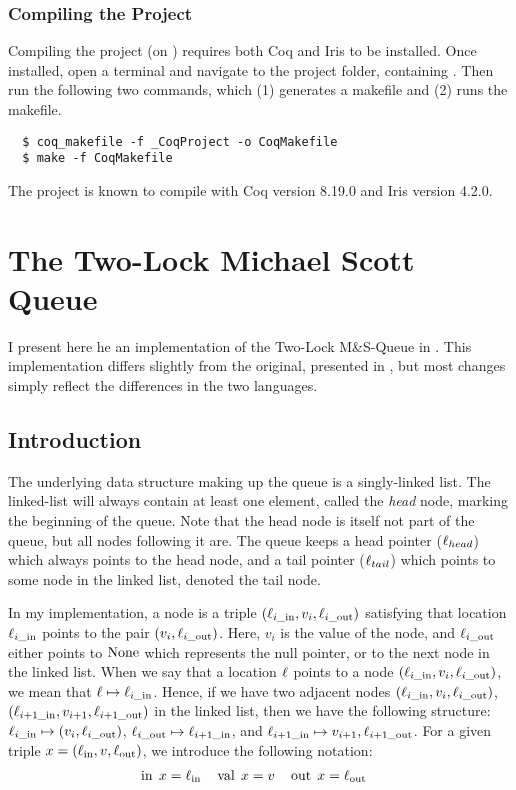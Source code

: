 \documentclass[a4paper, 11pt]{report}
\newcommand{\tlmsq}{Two-Lock M\&S-Queue\xspace}
\newcommand{\locin}[1]{\loc_{#1\_\text{in}}}
\newcommand{\locout}[1]{\loc_{#1\_\text{out}}}
\newcommand{\nIn}[1]{\operatorname{in} \; #1}
\newcommand{\nVal}[1]{\operatorname{val} \; #1}
\newcommand{\nOut}[1]{\operatorname{out} \; #1}
\begin{document}
\subsection{Compiling the Project}
Compiling the project (on \linuxname) requires both Coq and Iris to be installed. Once installed, open a terminal and navigate to the project folder, containing . Then run the following two commands, which (1) generates a makefile and (2) runs the makefile.
\begin{verbatim}
  $ coq_makefile -f _CoqProject -o CoqMakefile
  $ make -f CoqMakefile
\end{verbatim}
The project is known to compile with Coq version 8.19.0 and Iris version 4.2.0.


\chapter{The Two-Lock Michael Scott Queue}
\label{ch:TLMSQ}

I present here he an implementation of the \tlmsq in \heaplang. This implementation differs slightly from the original, presented in \cite{DBLP:conf/podc/MichaelS96}, but most changes simply reflect the differences in the two languages.


\section{Introduction}
\label{TLMSQ:section:introduction}

The underlying data structure making up the queue is a singly-linked list. The linked-list will always contain at least one element, called the \emph{head} node, marking the beginning of the queue. Note that the head node is itself not part of the queue, but all nodes following it are. The queue keeps a head pointer ($\ell_{head}$) which always points to the head node, and a tail pointer ($\ell_{tail}$) which points to some node in the linked list, denoted the tail node.

In my implementation, a node is a triple $(\locin{i}, v_i, \locout{i})$ satisfying that location $\locin{i}$ points to the pair $(v_i, \locout{i})$. Here, $v_i$ is the value of the node, and $\locout{i}$ either points to $\operatorname{None}$ which represents the null pointer, or to the next node in the linked list. When we say that a location $\ell$ points to a node $(\locin{i}, v_i, \locout{i})$, we mean that $\loc \mapsto \locin{i}$. Hence, if we have two adjacent nodes $(\locin{i}, v_i, \locout{i})$, $(\locin{i+1}, v_{i+1}, \locout{i+1})$ in the linked list, then we have the following structure: $\locin{i} \mapsto (v_i, \locout{i})$, $\locout{i} \mapsto \locin{i+1}$, and $\locin{i+1} \mapsto v_{i+1}, \locout{i+1}$.
For a given triple $x = (\ell_\text{in}, v, \ell_\text{out})$, we introduce the following notation:
\begin{align*}
  &\nIn{x} = \loc_\text{in}& &\nVal{x} = v& &\nOut{x} = \loc_\text{out}
\end{align*}
\end{document}
